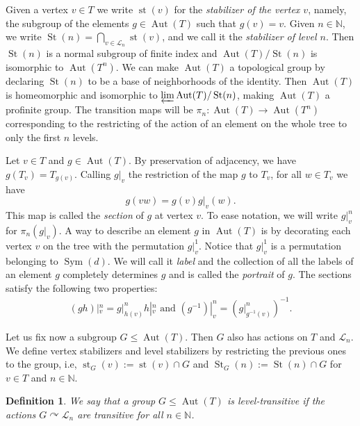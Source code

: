 \documentclass{amsart}
\def\NN{\mathbb N}
\DeclareMathOperator{\Aut}{Aut}
\DeclareMathOperator{\St}{St}
\DeclareMathOperator{\Sym}{Sym}
\DeclareMathOperator{\st}{st}
\newtheorem{Definition}[Proposition]{Definition}
\begin{document}
Given a vertex $v \in T$ we write $\st(v)$ for the \textit{stabilizer of the vertex $v$}, namely, the subgroup of the elements $g \in \Aut(T)$ such that $g(v) = v$. Given $n \in \NN$, we write $\St(n) = \bigcap_{v\in \mathcal{L}_n}\st(v)$, and we call it the \textit{stabilizer of level $n$}. Then $\St(n)$ is a normal subgroup of finite index and $\Aut(T)/\St(n)$ is isomorphic to $\Aut(T^n)$. We can make $\Aut(T)$ a topological group by declaring $\St(n)$ to be a base of neighborhoods of the identity. Then $\Aut(T)$ is homeomorphic and isomorphic to $\varprojlim \Aut(T)/\St(n)$, making $\Aut(T)$ a profinite group. The transition maps will be $\pi_n: \Aut(T) \rightarrow \Aut(T^n)$ corresponding to the restricting of the action of an element on the whole tree to only the first $n$ levels. 

Let $v \in T$ and $g \in \Aut(T)$. By preservation of adjacency, we have $g(T_v) = T_{g(v)}$. Calling $g|_v$ the restriction of the map $g$ to $T_v$, for all $w \in T_v$ we have $$g(vw)=g(v)g|_v(w).$$ This map is called the \textit{section} of $g$ at vertex $v$. To ease notation, we will write $g|_v^n$ for $\pi_n(g|_v)$. A way to describe an element $g$ in $\Aut(T)$ is by decorating each vertex $v$ on the tree with the permutation $g|_v^1$. Notice that $g|_v^1$ is a permutation belonging to $\Sym(d)$. We will call it \textit{label} and the collection of all the labels of an element $g$ completely determines $g$ and is called the \textit{portrait} of $g$. The sections satisfy the following two properties: 
\begin{align}
(gh)|_v^n = g|_{h(v)}^n h|_v^n \text{ and } (g^{-1})|_v^n = (g|_{g^{-1}(v)}^n)^{-1}.
\label{equation: properties sections}
\end{align}

Let us fix now a subgroup $G \le \Aut(T)$. Then $G$ also has actions on $T$ and $\mathcal{L}_n$. We define vertex stabilizers and level stabilizers by restricting the previous ones to the group, i.e, $\st_G(v) := \st(v) \cap G$ and $\St_G(n) := \St(n) \cap G$ for $v \in T$ and $n \in \NN$.

\begin{Definition}
We say that a group $G \leq \Aut(T)$ is \textit{level-transitive} if the actions $G \curvearrowright \mathcal{L}_n$ are transitive for all $n \in \NN$. 
\end{Definition}
\end{document}
